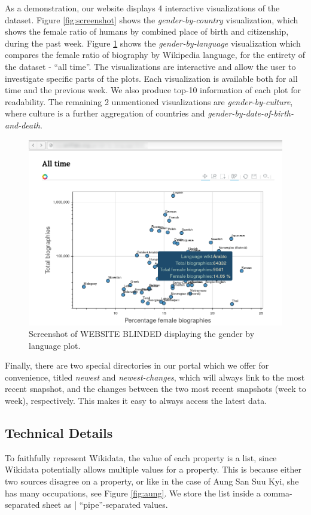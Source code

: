 \documentclass[letterpaper]{article}
\begin{document}
As a demonstration, our website displays 4 interactive visualizations of the dataset. Figure \ref{fig:screenshot} shows the \textit{gender-by-country} visualization, which shows the female ratio of humans by combined place of birth and citizenship, during the past week. Figure \ref{fig:screenshot2} shows the \textit{gender-by-language} visualization which compares the female ratio of biography by Wikipedia language, for the entirety of the dataset - ``all time''. The visualizations are interactive and allow the user to investigate specific parts of the plots. Each visualization is available both for all time and the previous week. We also produce top-10 information of each plot for readability. The remaining 2 unmentioned visualizations are \textit{gender-by-culture}, where culture is a further aggregation of countries and \textit{gender-by-date-of-birth-and-death}.

\begin{figure}
\label{fig:screenshot2}
\includegraphics[scale=0.25]{figures/screenshot2.png}
\caption{Screenshot of WEBSITE BLINDED displaying the gender by language plot.}
\end{figure}

Finally, there are two special directories in our portal which we offer for convenience,  titled \textit{newest} and \textit{newest-changes}, which will always link to the most recent snapshot, and the changes between the two most recent snapshots (week to week), respectively. This makes it easy to always access the latest data.

\subsection{Technical Details}
To faithfully represent Wikidata, the value of each property is a list, since Wikidata potentially allows multiple values for a property. This is because either two sources disagree on a property, or like in the case of Aung San Suu Kyi, she has many occupations, see Figure \ref{fig:aung}. We store the list inside a comma-separated sheet as | ``pipe''-separated values.
\end{document}
